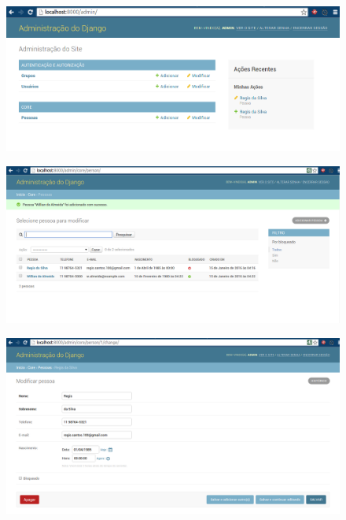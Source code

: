 \documentclass[aspectratio=169]{beamer}
\begin{document}
{\begin{frame}
\end{frame}



\begin{frame}

    \begin{figure}[h]
      \centering
        \includegraphics[width=.8\paperwidth]{img/admin2.png}
    \end{figure}

\end{frame}



\begin{frame}

    \begin{figure}[h]
      \centering
        \includegraphics[width=.8\paperwidth]{img/admin3.png}
    \end{figure}

\end{frame}



\begin{frame}

    \begin{figure}[h]
      \centering
        \includegraphics[width=.8\paperwidth]{img/admin4.png}
    \end{figure}


\end{frame}}
\end{document}
